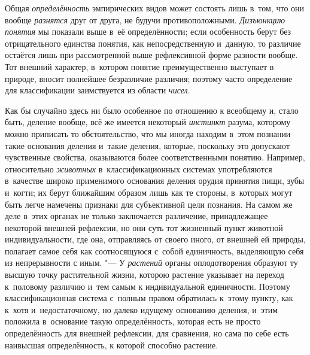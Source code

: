 Общая {\em определённость}
эмпирических видов может состоять лишь в~том, что они вообще
{\em разнятся} друг от
друга, не будучи противоположными.
{\em Дизъюнкцию понятия}
мы показали выше в~её определённости; если особенность берут
без отрицательного единства понятия, как непосредственную и~данную, то
различие остаётся лишь при рассмотренной выше рефлексивной форме разности
вообще. Тот внешний характер, в~котором понятие преимущественно выступает в
природе, вносит полнейшее безразличие различия; поэтому часто определение
для классификации заимствуется из области
{\em чисел}.

Как бы случайно здесь ни было особенное по отношению к
всеобщему и, стало быть, деление вообще, всё же имеется некоторый
{\em инстинкт} разума,
которому можно приписать то обстоятельство, что мы иногда находим в~этом
познании такие основания деления и~такие деления, которые, поскольку это
допускают чувственные свойства, оказываются более соответственными понятию.
Например, относительно {\em животных}
в~классификационных системах употребляются в~качестве широко
применимого основания деления орудия принятия пищи, зубы и~когти; их берут
ближайшим образом лишь как те стороны, в~которых могут быть легче намечены
признаки для субъективной цели познания. На самом же деле в~этих органах не
только заключается различение, принадлежащее некоторой внешней рефлексии,
но они суть тот жизненный пункт животной индивидуальности, где она,
отправляясь от своего иного, от внешней ей природы, полагает самое себя
как соотносящуюся с~собой единичность, выделяющую себя из непрерывности с
иным. "--- У {\em растений} органы
оплодотворения образуют ту высшую точку растительной жизни, которою
растение указывает на переход к~половому различию и~тем самым к
индивидуальной единичности. Поэтому классификационная система с~полным
правом обратилась к~этому пункту, как к~хотя и~недостаточному, но далеко
идущему основанию деления, и~этим положила в~основание такую
определённость, которая есть не просто определённость для внешней
рефлексии, для сравнения, но сама по себе есть наивысшая определённость, к
которой способно растение.


